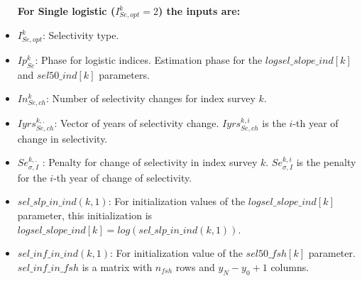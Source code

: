 \documentclass{article}
\begin{document}
\begin{itemize}
    \textbf{For Single logistic 
 ($I_{Se,opt}^k=2$) the inputs are:}\\
    \item $I_{Se,opt}^k$: Selectivity type.
    \item $Ip_{Se}^k$: Phase for logistic indices. Estimation phase for the $logsel\_slope\_ind[k]$ and $sel50\_ind[k]$ parameters.
   \item $In_{Se,ch}^k$: Number of selectivity changes for index survey $k$.
    \item $Iyrs_{Se,ch}^{k,.}$: Vector of years of selectivity change. $Iyrs_{Se,ch}^{k,i}$ is the $i$-th year of change in selectivity.
    \item $Se_{\sigma,I}^{k,.}$ : Penalty for change of selectivity in index survey $k$.  $Se_{\sigma,I}^{k,i}$ is the penalty for the $i$-th year of change of selectivity.
    \item $sel\_slp\_in\_ind(k,1)$: For initialization values of the $logsel\_slope\_ind[k]$ parameter, this initialization is $logsel\_slope\_ind[k]=log(sel\_slp\_in\_ind(k,1))$.
    \item $sel\_inf\_in\_ind(k,1)$: For initialization value of the $sel50\_fsh[k]$ parameter.     $sel\_inf\_in\_fsh$ is a matrix with $n_{fsh}$ rows and $y_N-y_0+1$ columns.
    

\end{itemize}
\end{document}

